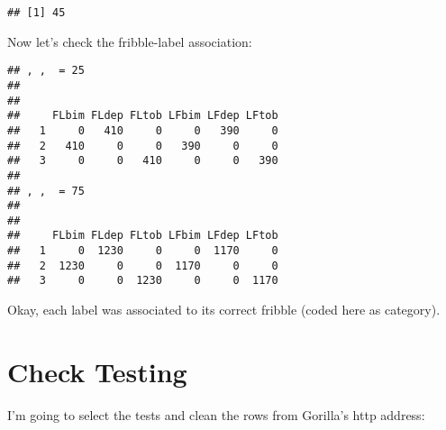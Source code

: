 \documentclass[
]{article}
\newenvironment{Shaded}{\begin{snugshade}}{\end{snugshade}}
\newcommand{\KeywordTok}[1]{\textcolor[rgb]{0.13,0.29,0.53}{\textbf{#1}}}
\newcommand{\NormalTok}[1]{#1}
\newcommand{\OperatorTok}[1]{\textcolor[rgb]{0.81,0.36,0.00}{\textbf{#1}}}
\begin{document}
\begin{verbatim}
## [1] 45
\end{verbatim}

Now let's check the fribble-label association:

\begin{Shaded}
\end{Shaded}

\begin{verbatim}
## , ,  = 25
## 
##    
##     FLbim FLdep FLtob LFbim LFdep LFtob
##   1     0   410     0     0   390     0
##   2   410     0     0   390     0     0
##   3     0     0   410     0     0   390
## 
## , ,  = 75
## 
##    
##     FLbim FLdep FLtob LFbim LFdep LFtob
##   1     0  1230     0     0  1170     0
##   2  1230     0     0  1170     0     0
##   3     0     0  1230     0     0  1170
\end{verbatim}

Okay, each label was associated to its correct fribble (coded here as
category).

\hypertarget{check-testing}{%
\section{Check Testing}\label{check-testing}}

I'm going to select the tests and clean the rows from Gorilla's http
address:
\end{document}
